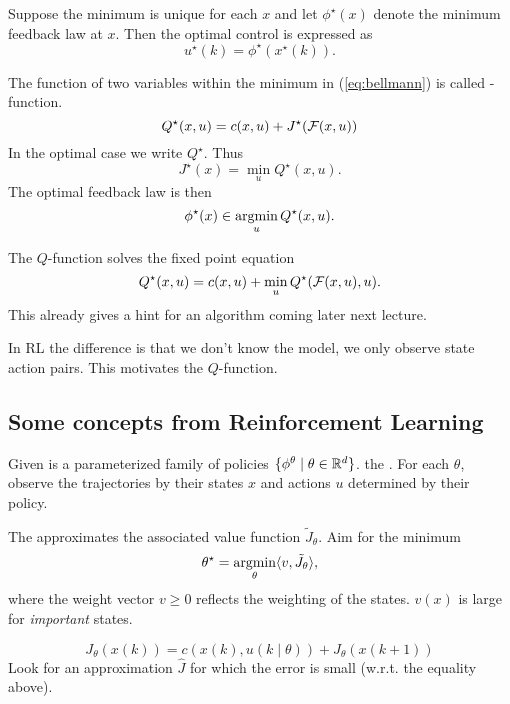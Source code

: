 Suppose the minimum is unique for each \(x\) and let \(\phi^\star(x)\) denote 
the minimum feedback law at \(x\). Then the optimal control is expressed as 
\[u^\star(k)=\phi^\star(x^\star(k)).\]

\begin{definition}[Q-function]\label{def:1.14}
    The function of two variables within the minimum in (\ref{eq:bellmann}) is called -function.
    \[Q^\star(x,u)=c(x,u)+J^\star(\mathcal{F}(x,u))\]
    In the optimal case we write \(Q^\star\). Thus 
    \[J^\star(x)=\min_{u}Q^\star(x,u).\] 
    The optimal feedback law is then 
    \[\phi^\star(x)\in\operatorname*{\text{argmin}}_{u}Q^\star(x,u).\]    
\end{definition} %

The \(Q\)-function solves the fixed point equation 
\[Q^\star(x,u)=c(x,u)+\min_{u}Q^\star(\mathcal{F}(x,u),u).\]
This already gives a hint for an algorithm coming later next lecture.

\begin{remark}
    In RL the difference is that we don't know the model, we only observe state action pairs.
    This motivates the \(Q\)-function.        
\end{remark}

\subsection*{Some concepts from Reinforcement Learning}


Given is a parameterized family of policies \(\{\phi^\theta\mid \theta\in \mathbb{R}^d\}\).
the . For each \(\theta\), observe the trajectories by their states 
\(x\) and actions \(u\) determined by their policy.

The  approximates the associated value function 
\(\tilde{J}_\theta\). Aim for the minimum 
\[\theta^\star=\operatorname*{\text{argmin}}_{\theta}\langle v, \tilde{J}_\theta \rangle,\]
where the weight vector \(v\geq 0\) reflects the weighting of the states. \(v(x)\) is large for \textit{important} states.


\[J_\theta(x(k))=c(x(k),u(k\mid\theta))+J_\theta(x(k+1))\]
Look for an approximation \(\hat{J}\) for which the error is small (w.r.t. the equality above).

